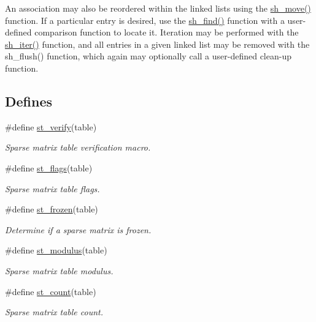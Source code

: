 An association may also be reordered within the linked lists using the \hyperlink{group__dbprim__smat_a18}{sh\_\-move()} function. If a particular entry is desired, use the \hyperlink{group__dbprim__smat_a19}{sh\_\-find()} function with a user-defined comparison function to locate it. Iteration may be performed with the \hyperlink{group__dbprim__smat_a20}{sh\_\-iter()} function, and all entries in a given linked list may be removed with the sh\_\-flush() function, which again may optionally call a user-defined clean-up function. \subsection*{Defines}
\begin{CompactItemize}
\item 
\#define \hyperlink{group__dbprim__smat_a21}{st\_\-verify}(table)
\begin{CompactList}\small\item\em Sparse matrix table verification macro.\item\end{CompactList}\item 
\#define \hyperlink{group__dbprim__smat_a22}{st\_\-flags}(table)
\begin{CompactList}\small\item\em Sparse matrix table flags.\item\end{CompactList}\item 
\#define \hyperlink{group__dbprim__smat_a23}{st\_\-frozen}(table)
\begin{CompactList}\small\item\em Determine if a sparse matrix is frozen.\item\end{CompactList}\item 
\#define \hyperlink{group__dbprim__smat_a24}{st\_\-modulus}(table)
\begin{CompactList}\small\item\em Sparse matrix table modulus.\item\end{CompactList}\item 
\#define \hyperlink{group__dbprim__smat_a25}{st\_\-count}(table)
\begin{CompactList}\small\item\em Sparse matrix table count.\item\end{CompactList}\item 

\end{CompactItemize}
